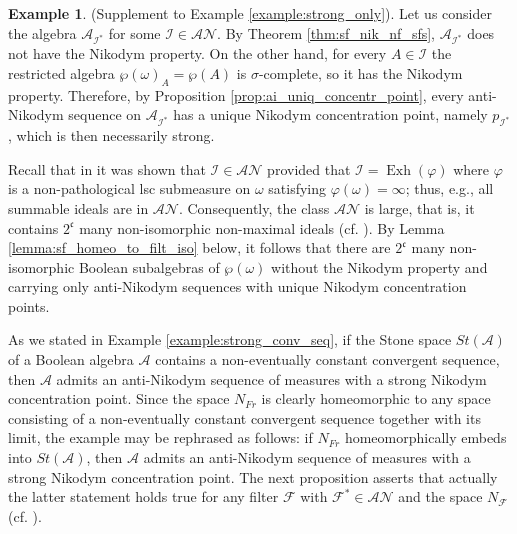 \documentclass[a4paper,11pt,fleqn]{amsart}
\theoremstyle{definition}
\newtheorem{example}[theorem]{Example}
\theoremstyle{remark}
\numberwithin{equation}{section}
\newcommand{\frakc}{\mathfrak{c}}
\newcommand{\N}{\mathbb{N}}
\newcommand{\aA}{\mathcal{A}}
\newcommand{\fF}{\mathcal{F}}
\newcommand{\iI}{\mathcal{I}}
\newcommand{\nN}{\mathcal{N}}
\DeclareMathOperator{\exh}{Exh}
\newcommand{\wo}{{\wp(\omega)}}%
\begin{document}
\begin{example}\label{example:wo_no_nikodym} (Supplement to Example \ref{example:strong_only}). Let us consider the algebra $\aA_{\iI^*}$ for some $\iI\in\aA\nN$. %
By Theorem \ref{thm:sf_nik_nf_sfs}, $\aA_{\iI^*}$ does not have the Nikodym property. On the other hand, for every $A\in\iI$ the restricted algebra $\wo_A=\wp(A)$ is $\sigma$-complete, so it has the Nikodym property. Therefore, by Proposition \ref{prop:ai_uniq_concentr_point}, every anti-Nikodym sequence on $\aA_{\iI^*}$ has a unique Nikodym concentration point, namely $p_{\iI^*}$, which is then necessarily strong.

Recall that in \cite{Zuc25} it was shown that $\iI\in\aA\nN$ provided that $\iI=\exh(\varphi)$ where $\varphi$ is a non-pathological lsc submeasure on $\omega$ satisfying $\varphi(\omega)=\infty$; thus, e.g., all summable ideals are in $\aA\nN$. Consequently, the class $\aA\nN$ is large, that is, it contains $2^\frakc$ many non-isomorphic non-maximal ideals (cf. \cite[Corollary 7.4]{Zuc25}). By Lemma \ref{lemma:sf_homeo_to_filt_iso} below, it follows that there are $2^\frakc$ many non-isomorphic Boolean subalgebras of $\wo$ without the Nikodym property and carrying only anti-Nikodym sequences with unique Nikodym concentration points. 
\end{example}

As we stated in Example \ref{example:strong_conv_seq}, if the Stone space $St(\aA)$ of a Boolean algebra $\aA$ contains a non-eventually constant convergent sequence, then $\aA$ admits an anti-Nikodym sequence of measures with a strong Nikodym concentration point. Since the space $N_{Fr}$ is clearly homeomorphic to any space consisting of a non-eventually constant convergent sequence together with its limit, the example may be rephrased as follows: if $N_{Fr}$ homeomorphically embeds into $St(\aA)$, then $\aA$ admits an anti-Nikodym sequence of measures with a strong Nikodym concentration point. The next proposition asserts that actually the latter statement holds true for any filter $\fF$ with $\fF^*\in\aA\nN$ and the space $N_{\fF}$ (cf. \cite[Theorem 8.2]{Zuc25}).
\end{document}
